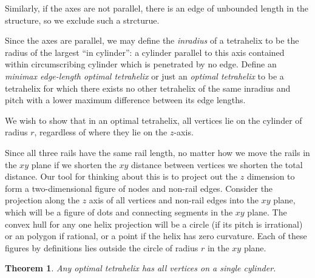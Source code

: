 \documentclass[11pt]{article}
\newtheorem{theorem}{Theorem}
\begin{document}
Similarly, if the axes are not parallel, there is an edge of
unbounded length in the structure, so we exclude such a strcturue.

Since the axes are parallel, we may define the \emph{inradius} of a tetrahelix to be the radius of the largest
``in cylinder'': a
cylinder parallel to this axis contained within circumscribing cylinder which is penetrated by no edge.
Define an \emph{minimax edge-length optimal tetrahelix} or just an
\emph{optimal tetrahelix} to be a tetrahelix for which there exists
no other tetrahelix of the same inradius and pitch with a lower maximum
difference between its edge lengths. 

We wish to show that in an optimal tetrahelix, all vertices lie on the cylinder
of radius $r$, regardless of where they lie on the $z$-axis.

Since all three rails have the same rail length, no matter how we
move the rails in the $xy$ plane if we shorten the $xy$ distance between
vertices we shorten the total distance.
Our tool for thinking about this is to project out the $z$ dimension to form
a two-dimensional figure of nodes and non-rail edges.
Consider the projection along the $z$ axis of all vertices and non-rail edges into the $xy$ plane, which will be
a figure of dots and connecting segments in the $xy$ plane. The convex
hull for any one helix projection will be a circle (if its pitch is
irrational) or an polygon if rational, or a point if the helix has
zero curvature. Each of these figures by definitions lies outside the
circle of radius $r$ in the $xy$ plane.

\begin{theorem}
  \label{thm:cylinder}
  Any optimal tetrahelix has all vertices on a single cylinder.
\end{theorem}
\end{document}
